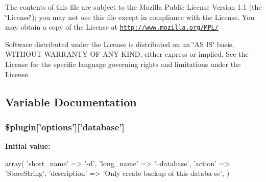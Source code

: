 The contents of this file are subject to the Mozilla Public License Version 1.1 (the \char`\"{}License\char`\"{}); you may not use this file except in compliance with the License. You may obtain a copy of the License at \href{http://www.mozilla.org/MPL/}{\tt http://www.mozilla.org/MPL/}

Software distributed under the License is distributed on an \char`\"{}AS IS\char`\"{} basis, WITHOUT WARRANTY OF ANY KIND, either express or implied. See the License for the specific language governing rights and limitations under the License. 

\subsection{Variable Documentation}
\hypertarget{plugin__backup-db_8class_8php_a65c50c96e967cddf682eb98f24f0532d}{
\subsubsection[{\$plugin}]{\setlength{\rightskip}{0pt plus 5cm}\$plugin\mbox{[}'options'\mbox{]}\mbox{[}'database'\mbox{]}}}
\label{plugin__backup-db_8class_8php_a65c50c96e967cddf682eb98f24f0532d}
{\bfseries Initial value:}
\begin{DoxyCode}
 array(
                              'short_name'  => '-d',
                              'long_name'   => '--database',
                              'action'      => 'StoreString',
                              'description' => 'Only create backup of this databa
      se',
                            )
\end{DoxyCode}
